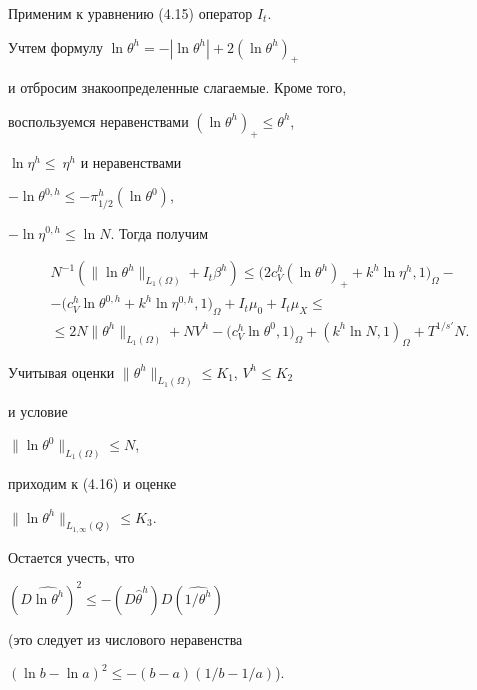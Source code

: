 \documentclass[12pt]{article}
\theoremstyle{plain} %
\theoremstyle{definition}
\numberwithin{equation}{section}
\begin{document}
\begin{pf} Применим к уравнению (4.15) оператор $I_t$.


Учтем формулу $\ln\theta^h= -|\ln\theta^h|+2(\ln\theta^h)_+$


и отбросим знакоопределенные слагаемые. Кроме того,


воспользуемся неравенствами $(\ln\theta^h)_+\le\theta^h$,


$\ln\eta^h\le~\eta^h$ и неравенствами


$-\ln\theta^{0,h}\le-\pi^h_{1/2}(\ln\theta^0)$,


$-\ln\eta^{0,h}\le \ln N$. Тогда получим


\begin{multline*}


N^{-1}(\|\ln\theta^h\|_{L_1(\Omega)} + I_t\beta^h)\le


\bigl(2c^h_V(\ln\theta^h)_+ +


k^h\ln\eta^h,1\bigr)_\Omega - \\


%


-\bigl(c^h_V\ln\theta^{0,h} +


k^h\ln\eta^{0,h},1\bigr)_\Omega + I_t\mu_0 + I_t\mu_X\le \\


%


\le 2N\|\theta^h\|_{L_1(\Omega)}+NV^h -


\bigl(c_V^h\ln\theta^0,1\bigr)_\Omega + (k^h\ln N,1)_\Omega+ T^{1/{s'}}N.


\end{multline*}


Учитывая оценки $\|\theta^h\|_{L_1(\Omega)}\le K_1$, $V^h\le K_2$


и условие


$\|\ln\theta^0\|_{L_1(\Omega)}\le N$,


приходим к (4.16) и оценке


$\|\ln\theta^h\|_{L_{1,\infty}(Q)}\le K_3$.


Остается учесть, что


$(D\widehat{\ln \theta^h})^2


\le -(D\widehat\theta^h)D(\widehat{1/{\theta^h}})$


(это следует из числового неравенства


$(\ln b - \ln a)^2\le -(b-a)(1/b-1/a)$).


\end{pf}
\end{document}
